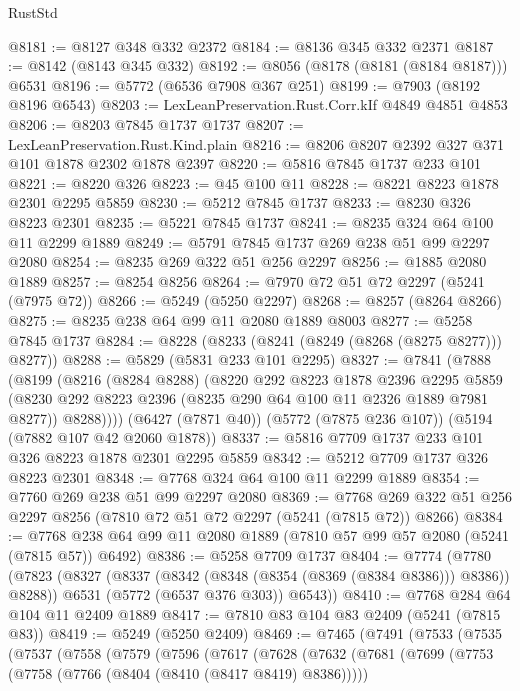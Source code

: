\begin{lexlean}{RustStd}
\begin{coremodule}
@8181 := @8127 @348 @332 @2372
@8184 := @8136 @345 @332 @2371
@8187 := @8142 (@8143 @345 @332)
@8192 := @8056 (@8178 (@8181 (@8184 @8187))) @6531
@8196 := @5772 (@6536 @7908 @367 @251)
@8199 := @7903 (@8192 @8196 @6543)
@8203 := LexLeanPreservation.Rust.Corr.kIf @4849 @4851 @4853
@8206 := @8203 @7845 @1737 @1737
@8207 := LexLeanPreservation.Rust.Kind.plain
@8216 := @8206 @8207 @2392 @327 @371 @101 @1878 @2302 @1878 @2397
@8220 := @5816 @7845 @1737 @233 @101
@8221 := @8220 @326
@8223 := @45 @100 @11
@8228 := @8221 @8223 @1878 @2301 @2295 @5859
@8230 := @5212 @7845 @1737
@8233 := @8230 @326 @8223 @2301
@8235 := @5221 @7845 @1737
@8241 := @8235 @324 @64 @100 @11 @2299 @1889
@8249 := @5791 @7845 @1737 @269 @238 @51 @99 @2297 @2080
@8254 := @8235 @269 @322 @51 @256 @2297
@8256 := @1885 @2080 @1889
@8257 := @8254 @8256
@8264 := @7970 @72 @51 @72 @2297 (@5241 (@7975 @72))
@8266 := @5249 (@5250 @2297)
@8268 := @8257 (@8264 @8266)
@8275 := @8235 @238 @64 @99 @11 @2080 @1889 @8003
@8277 := @5258 @7845 @1737
@8284 := @8228 (@8233 (@8241 (@8249 (@8268 (@8275 @8277))) @8277))
@8288 := @5829 (@5831 @233 @101 @2295)
@8327 := @7841
    (@7888
      (@8199
        (@8216
          (@8284 @8288)
          (@8220
            @292
            @8223
            @1878
            @2396
            @2295
            @5859
            (@8230 @292 @8223 @2396 (@8235 @290 @64 @100 @11 @2326 @1889 @7981 @8277))
            @8288))))
    (@6427 (@7871 @40))
    (@5772 (@7875 @236 @107))
    (@5194 (@7882 @107 @42 @2060 @1878))
@8337 := @5816 @7709 @1737 @233 @101 @326 @8223 @1878 @2301 @2295 @5859
@8342 := @5212 @7709 @1737 @326 @8223 @2301
@8348 := @7768 @324 @64 @100 @11 @2299 @1889
@8354 := @7760 @269 @238 @51 @99 @2297 @2080
@8369 := @7768 @269 @322 @51 @256 @2297 @8256 (@7810 @72 @51 @72 @2297 (@5241 (@7815 @72)) @8266)
@8384 := @7768 @238 @64 @99 @11 @2080 @1889 (@7810 @57 @99 @57 @2080 (@5241 (@7815 @57)) @6492)
@8386 := @5258 @7709 @1737
@8404 := @7774
    (@7780
      (@7823
        (@8327 (@8337 (@8342 (@8348 (@8354 (@8369 (@8384 @8386))) @8386)) @8288))
        @6531
        (@5772 (@6537 @376 @303))
        @6543))
@8410 := @7768 @284 @64 @104 @11 @2409 @1889
@8417 := @7810 @83 @104 @83 @2409 (@5241 (@7815 @83))
@8419 := @5249 (@5250 @2409)
@8469 := @7465
    (@7491
      (@7533
        (@7535
          (@7537
            (@7558
              (@7579
                (@7596
                  (@7617
                    (@7628
                      (@7632
                        (@7681
                          (@7699
                            (@7753 (@7758 (@7766 (@8404 (@8410 (@8417 @8419) @8386)))))

\end{coremodule}
\end{lexlean}
